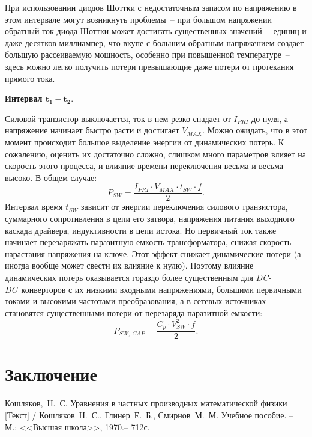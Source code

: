 При использовании диодов Шоттки с недостаточным запасом по напряжению в этом
интервале могут возникнуть проблемы~-- при большом напряжении обратный ток диода
Шоттки может достигать существенных значений~-- единиц и даже десятков
миллиампер, что вкупе с большим обратным напряжением создает большую
рассеиваемую мощность, особенно при повышенной температуре~-- здесь можно легко
получить потери превышающие даже потери от протекания прямого тока.

\textbf{Интервал \( \bm{t_1 - t_2} \)}.

Силовой транзистор выключается, ток в нем резко спадает от \( I_{PRI} \) до
нуля, а напряжение начинает быстро расти и достигает \( V_{MAX} \). Можно
ожидать, что в этот момент происходит большое выделение энергии от динамических
потерь. К сожалению, оценить их достаточно сложно, слишком много параметров
влияет на скорость этого процесса, и влияние времени переключения весьма и
весьма высоко. В общем случае:
\begin{equation}
    P_{SW} = \frac{I_{PRI}\cdot V_{MAX}\cdot t_{SW}\cdot f}{2}.
\end{equation}
Интервал время \( t_{SW} \) зависит от энергии переключения силового
транзистора, суммарного сопротивления в цепи его затвора, напряжения питания
выходного каскада драйвера, индуктивности в цепи истока. Но первичный ток также
начинает перезаряжать паразитную емкость трансформатора, снижая скорость
нарастания напряжения на ключе. Этот эффект снижает динамические потери (а
иногда вообще может свести их влияние к нулю). Поэтому влияние динамических
потерь оказывается гораздо более существенным для \emph{DC-DC}~конверторов с их
низкими входными напряжениями, большими первичными токами и высокими частотами
преобразования, а в сетевых источниках становятся существенными потери от
перезаряда паразитной емкости:
\begin{equation}
    P_{SW,\ CAP} = \frac{C_p\cdot V_{SW}^2\cdot f}{2}.
\end{equation}

\section{Заключение}
\newpage

\begin{thebibliography}{9}
    Кошляков,~Н.~С. Уравнения в частных производных
    математической физики [Текст] / Кошляков~Н.~С., Глинер~Е.~Б., Смирнов~М.~М.
    Учебное пособие. -- М.: <<Высшая школа>>, 1970.-- 712с.
\end{thebibliography}
